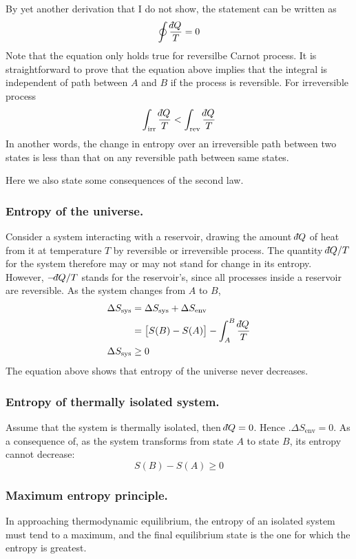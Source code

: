 \documentclass[../../../Main.tex]{subfiles}
\begin{document}
By yet another derivation that I do not show, the statement can be written as 
\begin{equation*}
    \oint\frac{\dbar Q}{T}=0
\end{equation*}
Note that the equation only holds true for reversilbe Carnot process. It is straightforward to prove that the equation above implies that the integral is independent of path between $A$ and $B$ if the process is reversible. For irreversible process
\begin{equation*}
    \int_{\text{irr}}\frac{\dbar Q}{T}<\int_{\text{rev}}\frac{\dbar Q}{T}
\end{equation*}
In another words, the change in entropy over an irreversible path between two states is less than that on any reversible path between same states.

Here we also state some consequences of the second law.

\subsubsection*{Entropy of the universe.} Consider a system interacting with a reservoir, drawing the amount $\dbar Q$ of heat from it at temperature $T$ by reversible or irreversible process. The quantity $\dbar Q/T$ for the system therefore may or may not stand for change in its entropy. However, $-\dbar Q /T$ stands for the reservoir's, since all processes inside a reservoir are reversible. As the system changes from $A$ to $B$,
\begin{align*}
    \Delta S_{\text{sys}} &=\Delta S_{\text{sys}}+\Delta S_{\text{env}}\\
    &=\big[S(B)-S{(A)}\big]-\int_A^B\frac{\dbar Q}{T}\\
    \Delta S_{\text{sys}} &\geq0
\end{align*}
The equation above shows that entropy of the universe never decreases.

\subsubsection*{Entropy of thermally isolated system.} Assume that the system is thermally isolated, then $\dbar Q = 0$. Hence $.\Delta S_{\text{env}}=0$. As a consequence of, as the system transforms from state $A$ to state $B$, its entropy cannot decrease:
\begin{equation*}
    S(B)-S(A)\geq0
\end{equation*}

\subsubsection*{Maximum entropy principle.} In approaching thermodynamic equilibrium, the entropy of an isolated system must tend to a maximum, and the final equilibrium state is the one for which the entropy is greatest.
\end{document}
